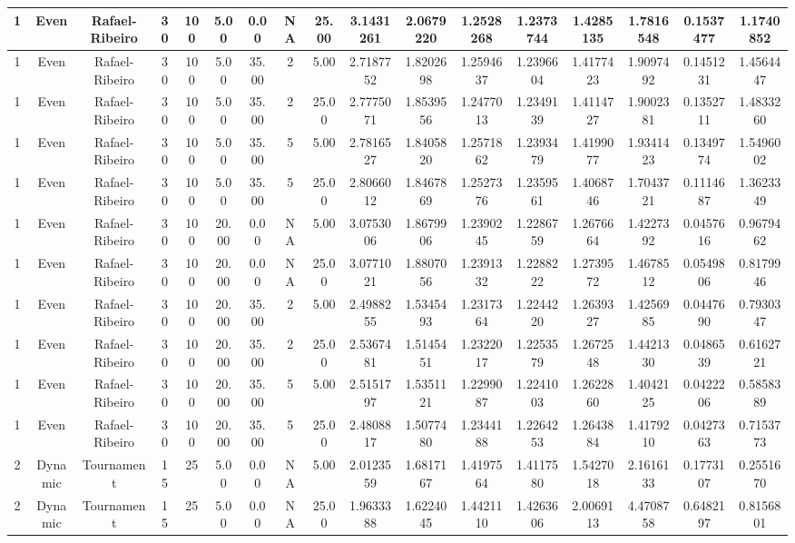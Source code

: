 \documentclass[a4paper]{article}
\begin{document}
\begin{center}
\begin{tabular}{ | c | c | c | c | c | c | c | c | c | c | c | c | c | c | c | c | c | }
		\hline
		1	&	Even	&	Rafael-Ribeiro	&	30	&	100	&	5.00	&	0.00	&	NA	&	25.00	&	3.1431261	&	2.0679220	&	1.2528268	&	1.2373744	&	1.4285135	&	1.7816548	&	0.1537477	&	1.1740852 \\
		\hline
		1	&	Even	&	Rafael-Ribeiro	&	30	&	100	&	5.00	&	35.00	&	2	&	5.00	&	2.7187752	&	1.8202698	&	1.2594637	&	1.2396604	&	1.4177423	&	1.9097492	&	0.1451231	&	1.4564447 \\
		\hline
		1	&	Even	&	Rafael-Ribeiro	&	30	&	100	&	5.00	&	35.00	&	2	&	25.00	&	2.7775071	&	1.8539556	&	1.2477013	&	1.2349139	&	1.4114727	&	1.9002381	&	0.1352711	&	1.4833260 \\
		\hline
		1	&	Even	&	Rafael-Ribeiro	&	30	&	100	&	5.00	&	35.00	&	5	&	5.00	&	2.7816527	&	1.8405820	&	1.2571862	&	1.2393479	&	1.4199077	&	1.9341423	&	0.1349774	&	1.5496002 \\
		\hline
		1	&	Even	&	Rafael-Ribeiro	&	30	&	100	&	5.00	&	35.00	&	5	&	25.00	&	2.8066012	&	1.8467869	&	1.2527376	&	1.2359561	&	1.4068746	&	1.7043721	&	0.1114687	&	1.3623349 \\
		\hline
		1	&	Even	&	Rafael-Ribeiro	&	30	&	100	&	20.00	&	0.00	&	NA	&	5.00	&	3.0753006	&	1.8679906	&	1.2390245	&	1.2286759	&	1.2676664	&	1.4227392	&	0.0457616	&	0.9679462 \\
		\hline
		1	&	Even	&	Rafael-Ribeiro	&	30	&	100	&	20.00	&	0.00	&	NA	&	25.00	&	3.0771021	&	1.8807056	&	1.2391332	&	1.2288222	&	1.2739572	&	1.4678512	&	0.0549806	&	0.8179946 \\
		\hline
		1	&	Even	&	Rafael-Ribeiro	&	30	&	100	&	20.00	&	35.00	&	2	&	5.00	&	2.4988255	&	1.5345493	&	1.2317364	&	1.2244220	&	1.2639327	&	1.4256985	&	0.0447690	&	0.7930347 \\
		\hline
		1	&	Even	&	Rafael-Ribeiro	&	30	&	100	&	20.00	&	35.00	&	2	&	25.00	&	2.5367481	&	1.5145451	&	1.2322017	&	1.2253579	&	1.2672548	&	1.4421330	&	0.0486539	&	0.6162721 \\
		\hline
		1	&	Even	&	Rafael-Ribeiro	&	30	&	100	&	20.00	&	35.00	&	5	&	5.00	&	2.5151797	&	1.5351121	&	1.2299087	&	1.2241003	&	1.2622860	&	1.4042125	&	0.0422206	&	0.5858389 \\
		\hline
		1	&	Even	&	Rafael-Ribeiro	&	30	&	100	&	20.00	&	35.00	&	5	&	25.00	&	2.4808817	&	1.5077480	&	1.2344188	&	1.2264253	&	1.2643884	&	1.4179210	&	0.0427363	&	0.7153773 \\
		\hline
		2	&	Dynamic	&	Tournament	&	15	&	25	&	5.00	&	0.00	&	NA	&	5.00	&	2.0123559	&	1.6817167	&	1.4197564	&	1.4117580	&	1.5427018	&	2.1616133	&	0.1773107	&	0.2551670 \\
		\hline
		2	&	Dynamic	&	Tournament	&	15	&	25	&	5.00	&	0.00	&	NA	&	25.00	&	1.9633388	&	1.6224045	&	1.4421110	&	1.4263606	&	2.0069113	&	4.4708758	&	0.6482197	&	0.8156801 \\

\end{tabular}
\end{center}
\end{document}
